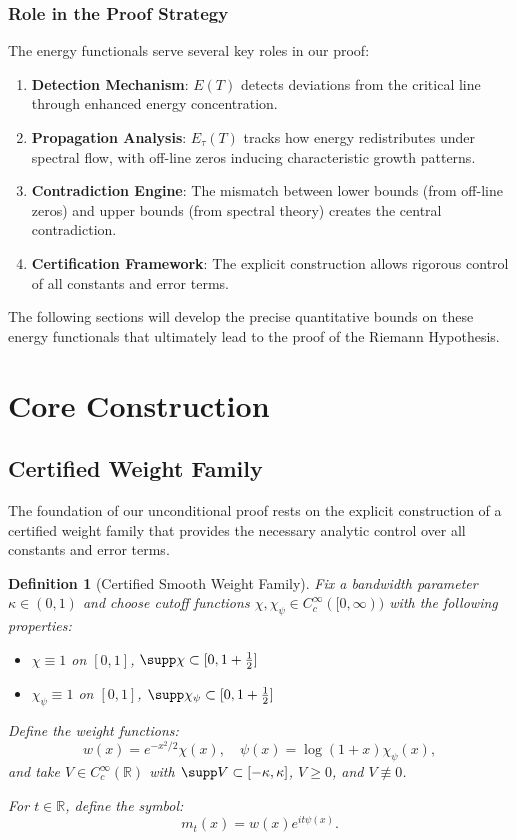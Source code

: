 \documentclass[11pt,hyp,]{nyjm}
\newtheorem{definition}[theorem]{Definition}
\begin{document}
\subsubsection{Role in the Proof Strategy}

The energy functionals serve several key roles in our proof:

\begin{enumerate}
\item \textbf{Detection Mechanism}: $E(T)$ detects deviations from the critical line through enhanced energy concentration.

\item \textbf{Propagation Analysis}: $E_\tau(T)$ tracks how energy redistributes under spectral flow, with off-line zeros inducing characteristic growth patterns.

\item \textbf{Contradiction Engine}: The mismatch between lower bounds (from off-line zeros) and upper bounds (from spectral theory) creates the central contradiction.

\item \textbf{Certification Framework}: The explicit construction allows rigorous control of all constants and error terms.
\end{enumerate}

The following sections will develop the precise quantitative bounds on these energy functionals that ultimately lead to the proof of the Riemann Hypothesis.

\section{Core Construction}

\subsection{Certified Weight Family}

The foundation of our unconditional proof rests on the explicit construction of a certified weight family that provides the necessary analytic control over all constants and error terms.

\begin{definition}[Certified Smooth Weight Family]\label{def:certified-weights}
Fix a bandwidth parameter $\kappa \in (0,1)$ and choose cutoff functions $\chi, \chi_\psi \in C_c^\infty([0,\infty))$ with the following properties:
\begin{itemize}
\item $\chi \equiv 1$ on $[0,1]$, $\supp\chi \subset [0,1+\tfrac12]$
\item $\chi_\psi \equiv 1$ on $[0,1]$, $\supp\chi_\psi \subset [0,1+\tfrac12]$
\end{itemize}
Define the weight functions:
\[
w(x) = e^{-x^2/2}\chi(x), \quad \psi(x) = \log(1+x)\chi_\psi(x),
\]
and take $V \in C_c^\infty(\mathbb{R})$ with $\supp V \subset [-\kappa,\kappa]$, $V \geq 0$, and $V \not\equiv 0$.

For $t \in \mathbb{R}$, define the symbol:
\[
m_t(x) = w(x)e^{it\psi(x)}.
\]
\end{definition}
\end{document}
